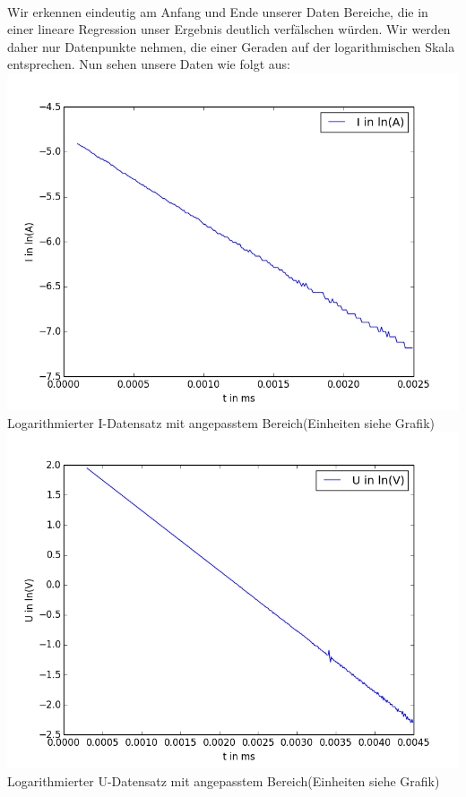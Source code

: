 \documentclass[12pt,a4paper]{article}
\begin{document}
\\ Wir erkennen eindeutig am Anfang und Ende unserer Daten Bereiche, die in einer lineare Regression unser Ergebnis deutlich verfälschen würden. Wir werden daher nur Datenpunkte nehmen, die einer Geraden auf der logarithmischen Skala entsprechen.
Nun sehen unsere Daten wie folgt aus:\\
\includegraphics[scale=0.35]{ln(Ik)ggt.png}\\
Logarithmierter I-Datensatz mit angepasstem Bereich(Einheiten siehe Grafik)\\
\includegraphics[scale=0.35]{ln(uk)ggt.png}\\
Logarithmierter U-Datensatz mit angepasstem Bereich(Einheiten siehe Grafik)\\
\end{document}
